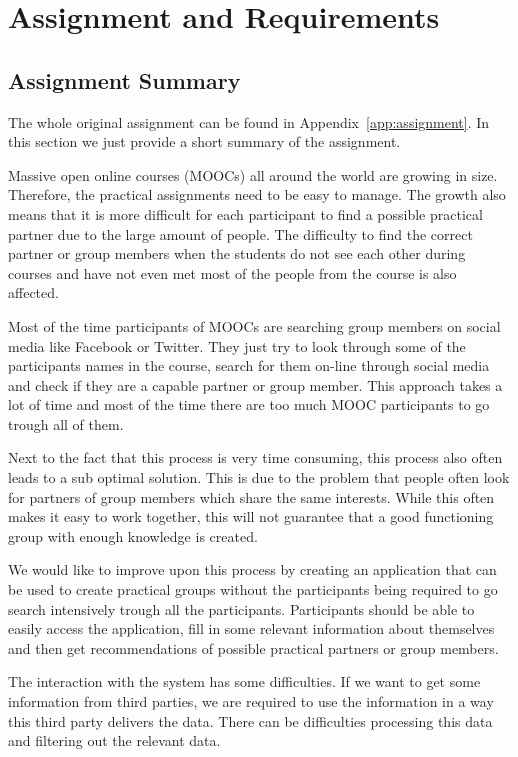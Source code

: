 \chapter{Assignment and Requirements}
\label{sec:requirements}

\section{Assignment Summary}
The whole original assignment can be found in Appendix~\ref{app:assignment}. In this section we just provide a short summary of the assignment. 

Massive open online courses (MOOCs) all around the world are growing in size. 
Therefore, the practical assignments need to be easy to manage.
The growth also means that it is more difficult for each participant to find a possible practical partner due to the large amount of people.
The difficulty to find the correct partner or group members when the students do not see each other during courses and have not even met most of the people from the course is also affected.

Most of the time participants of MOOCs are searching group members on social media like Facebook or Twitter.
They just try to look through some of the participants names in the course, search for them on-line through social media and check if they are a capable partner or group member.
This approach takes a lot of time and most of the time there are too much MOOC participants to go trough all of them.

Next to the fact that this process is very time consuming, this process also often leads to a sub optimal solution.
This is due to the problem that people often look for partners of group members which share the same interests.
While this often makes it easy to work together, this will not guarantee that a good functioning group with enough knowledge is created.

We would like to improve upon this process by creating an application that can be used to create practical groups without the participants being required to go search intensively trough all the participants.
Participants should be able to easily access the application, fill in some relevant information about themselves and then get recommendations of possible practical partners or group members.

The interaction with the system has some difficulties.
If we want to get some information from third parties, we are required to use the information in a way this third party delivers the data.
There can be difficulties processing this data and filtering out the relevant data.

